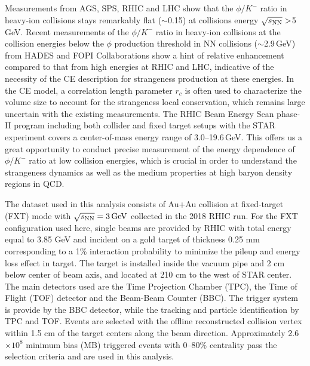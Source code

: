 \documentclass[%
 reprint,	
showpacs,
 amsmath,amssymb,
 aps,
 prc,
]{revtex4-1}
\begin{document}
Measurements from AGS, SPS, RHIC and LHC show that the $\phi/K^-$ ratio in heavy-ion collisions stays remarkably flat ($\sim$0.15) at collisions energy $\sqrt{s_{\rm NN}}>$5\,GeV. Recent measurements of the $\phi/K^-$ ratio in heavy-ion collisions at the collision energies below the $\phi$ production threshold in NN collisions ($\sim$2.9\,GeV) from HADES and FOPI Collaborations show a hint of relative enhancement compared to that from high energies at RHIC and LHC, %
indicative of the necessity of the CE description for strangeness production at these energies. In the CE model, a correlation length parameter $r_c$ is often used to characterize the volume size to account for the strangeness local conservation, which remains large uncertain with the existing measurements.
The RHIC Beam Energy Scan phase-II program including both collider and fixed target setups with the STAR experiment covers a center-of-mass energy range of 3.0--19.6\,GeV. This offers us a great opportunity to conduct precise measurement of the energy dependence of $\phi/K^-$ ratio at low collision energies, which is crucial in order to understand the strangeness dynamics as well as the medium properties at high baryon density regions in QCD.

The dataset used in this analysis consists of Au+Au collision at fixed-target (FXT) mode with ${\sqrt{s_{\rm NN}} = \rm{3\,GeV}}$ collected in the 2018 RHIC run. For the FXT configuration used here, single beams are provided by RHIC with total energy equal to 3.85 GeV and incident on a gold target of thickness 0.25 mm corresponding to a 1\% interaction probability to minimize the pileup and energy loss effect in target. The target is installed inside the vacuum pipe and 2 cm below center of beam axis, and located at 210 cm to the west of STAR center. The main detectors used are the Time Projection Chamber (TPC), the Time of Flight (TOF) detector and the Beam-Beam Counter (BBC). The trigger system is provide by the BBC detector, while the tracking and particle identification by TPC and TOF. Events are selected with the offline reconstructed collision vertex within 1.5 cm of the target centers along the beam direction. Approximately 2.6$\times 10^{8}$ minimum bias (MB) triggered events with 0--80\% centrality pass the selection criteria and are used in this analysis. 
\end{document}
